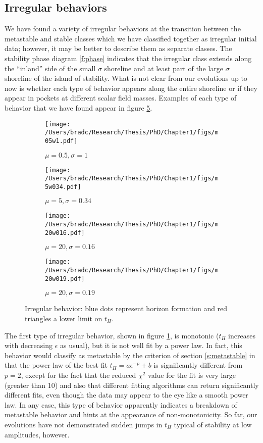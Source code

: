 \documentclass[../PhD.tex]{subfiles}
\begin{document}
\subsection{Irregular behaviors}

We have found a variety of irregular behaviors at the transition
between the metastable and stable classes which we have classified together
as irregular initial data; however, it may be better to describe them as
separate classes.  The stability phase diagram \ref{f:phase} indicates that the
irregular class extends along the ``inland'' side of the small $\sigma$
shoreline and at least part of the large $\sigma$ shoreline
of the island of stability.  What is not clear from our evolutions up to
now is whether each type of behavior appears along the entire shoreline
or if they appear in pockets at different scalar field masses. Examples
of each type of behavior that we have found appear in figure \ref{f:irregular}.

\begin{figure}[!t]
\centering
\begin{subfigure}[t]{0.47\textwidth}
\texttt{[image: /Users/bradc/Research/Thesis/PhD/Chapter1/figs/m05w1.pdf]}
\caption{$\mu=0.5,\sigma=1$}
\label{f:m05w1}
\end{subfigure}\hfill
\begin{subfigure}[t]{0.47\textwidth}
\texttt{[image: /Users/bradc/Research/Thesis/PhD/Chapter1/figs/m5w034.pdf]}
\caption{$\mu=5,\sigma=0.34$}
\label{f:m5w034}
\end{subfigure}
\begin{subfigure}[t]{0.47\textwidth}
\texttt{[image: /Users/bradc/Research/Thesis/PhD/Chapter1/figs/m20w016.pdf]}
\caption{$\mu=20,\sigma=0.16$}
\label{f:m20w016}
\end{subfigure}\hfill
\begin{subfigure}[t]{0.47\textwidth}
\texttt{[image: /Users/bradc/Research/Thesis/PhD/Chapter1/figs/m20w019.pdf]}
\caption{$\mu=20,\sigma=0.19$}
\label{f:m20w019}
\end{subfigure}
\caption[Horizon formation times for irregular initial data]{Irregular behavior: blue dots represent horizon formation and
red triangles a lower limit on $t_H$.
}
\label{f:irregular}
\end{figure}

The first type of irregular behavior, shown in figure \ref{f:m05w1}, is
monotonic ($t_H$ increases with decreasing $\epsilon$ as usual), but it is
not well fit by a power law.  In fact, this behavior would classify as
metastable by the criterion of section \ref{s:metastable} in that the
power law of the best fit $t_H=a\epsilon^{-p}+b$ is significantly different
from $p=2$, except for the fact that the reduced $\chi^2$ value for the
fit is very large (greater than 10)
and also that different fitting algorithms can return
significantly different fits, even though the data may appear to the eye
like a smooth power law.  In any case, this type of behavior apparently
indicates a breakdown of metastable behavior and hints at the appearance of
non-monotonicity.  So far, our evolutions have not demonstrated sudden jumps
in $t_H$ typical of stability at low amplitudes, however.
\end{document}
